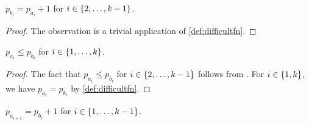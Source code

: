 %
%


\begin{observation}
\label{observation:difficultaibi}
$p_{b_i} = p_{a_i} + 1$
for $i \in \{2, \ldots, k-1\}$.
\end{observation}

\begin{proof}
The observation is a trivial application
of \cref{def:difficultfn}.
\end{proof}

\begin{observation}
\label{observation:difficultineqab}
$p_{a_i} \leq p_{b_i}$ for $i \in \{1, \ldots, k\}$.
\end{observation}

\begin{proof}
The fact that
$p_{a_i} \leq p_{b_i}$ for $i \in \{2, \ldots, k-1\}$
follows from .
For $i \in \{1, k\}$,
we have $p_{a_i} = p_{b_i}$
by \cref{def:difficultfn}.
\end{proof}

\begin{observation}
\label{observation:difficultprefixdist}
$p_{a_{i+1}} = p_{b_i} + 1$ for $i \in \{1, \ldots, k-1\}$.
\end{observation}

